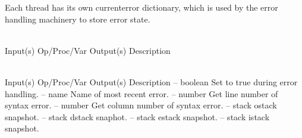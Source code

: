 Each thread has its own currenterror dictionary, which is used by the error
handling machinery to store error state.

\begin{longtable}{}
\caption{currenterror summary}
\\
\hline
\optableent
	{Input(s)}
	{Op/Proc/Var}
	{Output(s)}
	{Description}
\hline \hline
\endfirsthead
\caption[]{\emph{continued}} \\
\hline
\optableent
	{Input(s)}
	{Op/Proc/Var}
	{Output(s)}
	{Description}
\hline \hline \endhead
{} \endfoot
\hline \endlastfoot
\optableent
	{--}
	{{\bf {}}}
	{boolean}
	{Set to true during error handling.}
\hline
\optableent
	{--}
	{{\bf {}}}
	{name}
	{Name of most recent error.}
\hline
\optableent
	{--}
	{{\bf {}}}
	{number}
	{Get line number of syntax error.}
\hline
\optableent
	{--}
	{{\bf {}}}
	{number}
	{Get column number of syntax error.}
\hline
\optableent
	{--}
	{{\bf {}}}
	{stack}
	{ostack snapshot.}
\hline
\optableent
	{--}
	{{\bf {}}}
	{stack}
	{dstack snaphot.}
\hline
\optableent
	{--}
	{{\bf {}}}
	{stack}
	{estack snapshot.}
\hline
\optableent
	{--}
	{{\bf {}}}
	{stack}
	{istack snapshot.}
\end{longtable}

